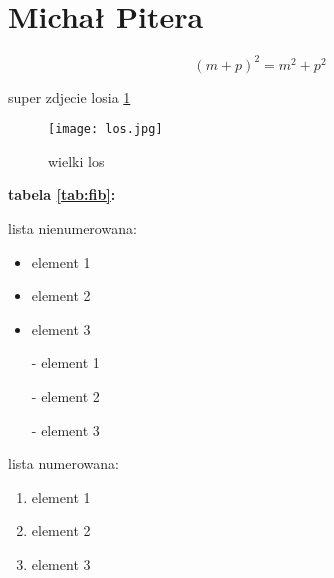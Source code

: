 \section{Michał Pitera}


\[(m+p)^2= m^2 + p^2\]


super zdjecie losia \ref{fig:los}
\begin{figure}[htbp]

    \centering
    \texttt{[image: los.jpg]}
    
    \caption{wielki los}
    \label{fig:los}
\end{figure}

\vspace{1cm}

\textbf{tabela \ref{tab:fib}:}


\vspace{3cm}

lista nienumerowana:

\begin{itemize}
  \item element 1
  \item element 2
  \item element 3
\end{itemize}

\begin{itemize}
  \item[-] element 1
  \item[-] element 2
  \item[-] element 3
\end{itemize}



lista numerowana:
\begin{enumerate}
  \item element 1
  \item element 2
  \item element 3
\end{enumerate}

